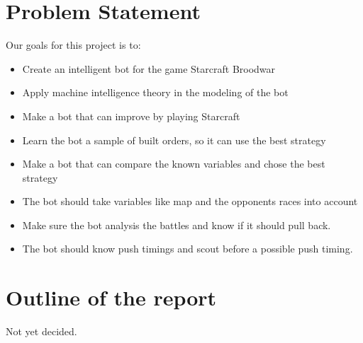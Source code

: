 \section{Problem Statement}
	Our goals for this project is to:
	\begin{itemize}
		\item Create an intelligent bot for the game Starcraft Broodwar
		\item Apply machine intelligence theory in the modeling of the bot
		\item Make a bot that can improve by playing Starcraft
		\item Learn the bot a sample of built orders, so it can use the best strategy
		\item Make a bot that can compare the known variables and chose the best strategy
		\item The bot should take variables like map and the opponents races into account 		
		\item Make sure the bot analysis the battles and know if it should pull back.
		\item The bot should know push timings and scout before a possible push timing.
	\end{itemize}

\section{Outline of the report}
	Not yet decided.